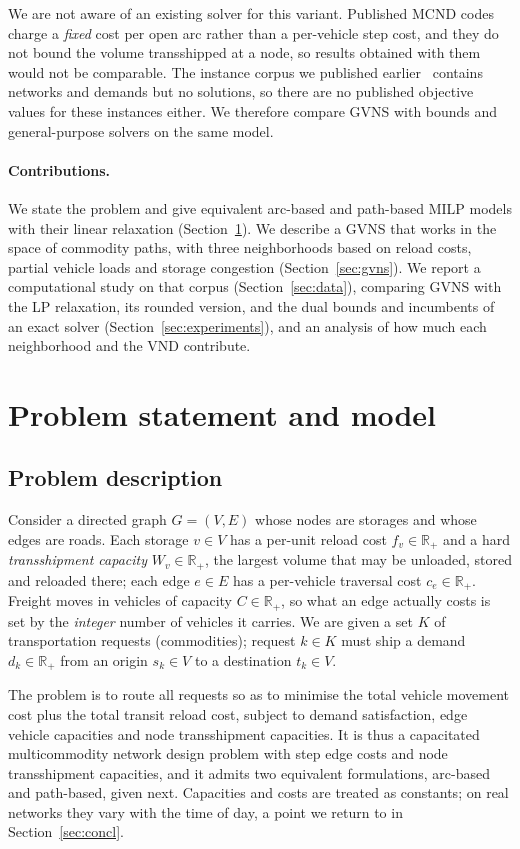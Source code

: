 \documentclass[runningheads]{llncs}
\newcommand{\E}{E}
\newcommand{\Vv}{V}
\newcommand{\Real}{\mathbb{R}}
\begin{document}
We are not aware of an existing solver for this variant. Published MCND codes
charge a \emph{fixed} cost per open arc rather than a per-vehicle step cost, and
they do not bound the volume transshipped at a node, so results obtained with them
would not be comparable. The instance corpus we published
earlier~\cite{benchmark,benchmark-data} contains networks and demands but no
solutions, so there are no published objective values for these instances either.
We therefore compare GVNS with bounds and general-purpose solvers on the same
model.

\paragraph{Contributions.} We state the problem and give equivalent arc-based and
path-based MILP models with their linear relaxation (Section~\ref{sec:model}). We
describe a GVNS that works in the space of commodity paths, with three
neighborhoods based on reload costs, partial vehicle loads and storage congestion
(Section~\ref{sec:gvns}). We report a computational study on that corpus
(Section~\ref{sec:data}), comparing GVNS with the LP relaxation, its rounded
version, and the dual bounds and incumbents of an exact solver
(Section~\ref{sec:experiments}), and an analysis of how much each neighborhood and
the VND contribute.

\section{Problem statement and model}
\label{sec:model}

\subsection{Problem description}
Consider a directed graph $G=(\Vv,\E)$ whose nodes are storages and whose edges
are roads. Each storage $v\in \Vv$ has a per-unit reload cost $f_v\in\Real_+$ and
a hard \emph{transshipment capacity} $W_v\in\Real_+$, the largest volume that may
be unloaded, stored and reloaded there; each edge $e\in \E$ has a per-vehicle
traversal cost $c_e\in\Real_+$. Freight moves in vehicles of capacity
$C\in\Real_+$, so what an edge actually costs is set by the \emph{integer} number
of vehicles it carries. We are given a set $K$ of transportation requests
(commodities); request $k\in K$ must ship a demand $d_k\in\Real_+$ from an origin
$s_k\in \Vv$ to a destination $t_k\in \Vv$.

The problem is to route all requests so as to minimise the total vehicle movement
cost plus the total transit reload cost, subject to demand satisfaction, edge
vehicle capacities and node transshipment capacities. It is thus a capacitated
multicommodity network design problem with step edge costs and node
transshipment capacities, and it admits two equivalent formulations, arc-based
and path-based, given next. Capacities and costs are treated as constants; on
real networks they vary with the time of day, a point we return to in
Section~\ref{sec:concl}.
\end{document}
